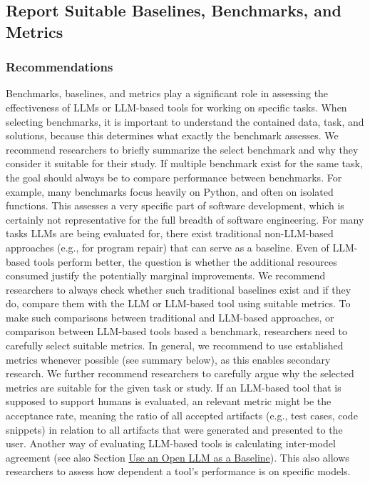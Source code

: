 



\subsection{Report Suitable Baselines, Benchmarks, and Metrics}

\subsubsection{Recommendations}

Benchmarks, baselines, and metrics play a significant role in assessing the effectiveness of LLMs or LLM-based tools for working on specific tasks.
When selecting benchmarks, it is important to understand the contained data, task, and solutions, because this determines what exactly the benchmark assesses.
We recommend researchers to briefly summarize the select benchmark and why they consider it suitable for their study.
If multiple benchmark exist for the same task, the goal should always be to compare performance between benchmarks.
For example, many benchmarks focus heavily on Python, and often on isolated functions. This assesses a very specific part of software development, which is certainly not representative for the full breadth of software engineering.
For many tasks LLMs are being evaluated for, there exist traditional non-LLM-based approaches (e.g., for program repair) that can serve as a baseline. Even of LLM-based tools perform better, the question is whether the additional resources consumed justify the potentially marginal improvements.
We recommend researchers to always check whether such traditional baselines exist and if they do, compare them with the LLM or LLM-based tool using suitable metrics.
To make such comparisons between traditional and LLM-based approaches, or comparison between LLM-based tools based a benchmark, researchers need to carefully select suitable metrics.
In general, we recommend to use established metrics whenever possible (see summary below), as this enables secondary research.
We further recommend researchers to carefully argue why the selected metrics are suitable for the given task or study. 
If an LLM-based tool that is supposed to support humans is evaluated, an relevant metric might be the acceptance rate, meaning the ratio of all accepted artifacts (e.g., test cases, code snippets) in relation to all artifacts that were generated and presented to the user.
Another way of evaluating LLM-based tools is calculating inter-model agreement (see also Section \href{/guidelines/#use-an-open-llm-as-a-baseline}{Use an Open LLM as a Baseline}).
This also allows researchers to assess how dependent a tool's performance is on specific models.

